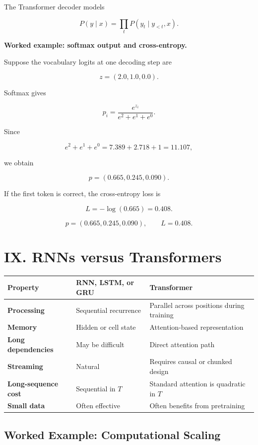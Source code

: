 \documentclass[11pt,a4paper,twoside]{article}
\begin{document}
The Transformer decoder models

\[
\boxed{
P(y\mid x)=\prod_tP(y_t\mid y_{<t},x)
}.
\]

\textbf{Worked example: softmax output and cross-entropy.}

Suppose the vocabulary logits at one decoding step are

\[
z=(2.0,1.0,0.0).
\]

Softmax gives

\[
p_i=\frac{e^{z_i}}{e^2+e^1+e^0}.
\]

Since

\[
e^2+e^1+e^0=7.389+2.718+1=11.107,
\]

we obtain

\[
p=(0.665,0.245,0.090).
\]

If the first token is correct, the cross-entropy loss is

\[
L=-\log(0.665)=0.408.
\]

\[
\boxed{p=(0.665,0.245,0.090),\qquad L=0.408.}
\]

\section*{IX. RNNs versus Transformers}

\begin{center}
\begin{tabularx}{0.97\textwidth}{>{\bfseries}p{3.0cm}XX}
\toprule
Property&RNN, LSTM, or GRU&Transformer\\ \midrule
Processing&Sequential recurrence&Parallel across positions during training\\
Memory&Hidden or cell state&Attention-based representation\\
Long dependencies&May be difficult&Direct attention path\\
Streaming&Natural&Requires causal or chunked design\\
Long-sequence cost&Sequential in $T$&Standard attention is quadratic in $T$\\
Small data&Often effective&Often benefits from pretraining\\ \bottomrule
\end{tabularx}
\end{center}

\subsection*{Worked Example: Computational Scaling}
\end{document}
